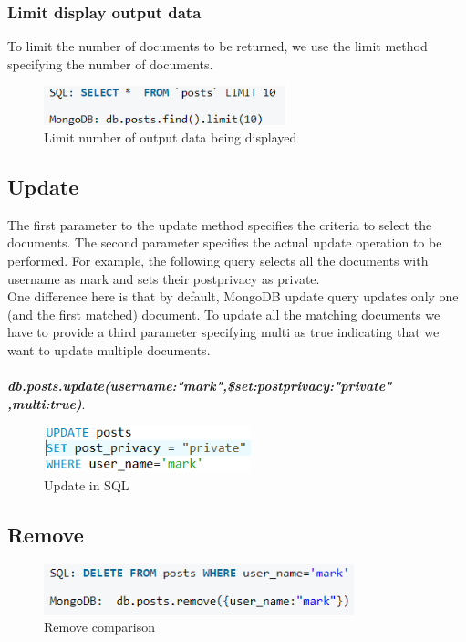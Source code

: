 \documentclass[conference]{IEEEtran}
\begin{document}
\subsubsection{Limit display output data}
To limit the number of documents to be returned, we use the limit method specifying the number of documents.
\begin{figure}[H]
    \centering
    \includegraphics[width=7cm]{Limit}
    \caption{Limit number of output data being displayed}
    \label{fig:fig4}
\end{figure}
\subsection{Update}
The first parameter to the update method specifies the criteria to select the documents. The second parameter specifies the actual update operation to be performed. For example, the following query selects all the documents with username as mark and sets their postprivacy as private.\\
One difference here is that by default, MongoDB update query updates only one (and the first matched) document. To update all the matching documents we have to provide a third parameter specifying multi as true indicating that we want to update multiple documents.
\\\\
\textbf{\textit{db.posts.update({username:"mark"},{\$set:{postprivacy:"private"\\}},{multi:true})}}.

\begin{figure}[H]
    \centering
    \includegraphics[width=6cm]{updatesql}
    \caption{Update in SQL}
    \label{fig:fig4}
\end{figure}

\subsection{Remove}
\begin{figure}[H]
    \centering
    \includegraphics[width=9cm]{remove}
    \caption{Remove comparison}
    \label{fig:fig4}
\end{figure}
\end{document}
